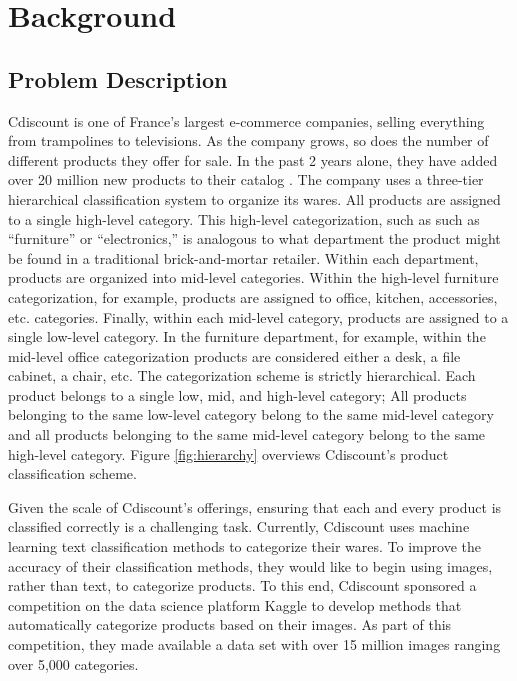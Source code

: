 \section{Background}

\subsection{Problem Description}


Cdiscount is one of France's largest e-commerce companies, selling everything from trampolines to televisions.
As the company grows, so does the number of different products they offer for sale.
In the past 2 years alone, they have added over 20 million new products to their catalog \cite{cDiscountKaggle}. 
The company uses a three-tier hierarchical classification system to organize its wares.
All products are assigned to a single high-level category.
This high-level categorization, such as such as ``furniture'' or ``electronics,'' is analogous to what department the product might be found in a traditional brick-and-mortar retailer. 
Within each department, products are organized into mid-level categories.
Within the high-level furniture categorization, for example, products are assigned to office, kitchen, accessories, etc. categories.
Finally, within each mid-level category, products are assigned to a single low-level category.
In the furniture department, for example, within the mid-level office categorization products are considered either a desk, a file cabinet, a chair, etc.
The categorization scheme is strictly hierarchical.
Each product belongs to a single low, mid, and high-level category; 
All products belonging to the same low-level category belong to the same mid-level category and all products belonging to the same mid-level category belong to the same high-level category.
Figure \ref{fig:hierarchy} overviews Cdiscount's product classification scheme.

Given the scale of Cdiscount's offerings, ensuring that each and every product is classified correctly is a challenging task.
Currently, Cdiscount uses machine learning text classification methods to categorize their wares.
To improve the accuracy of their classification methods, they would like to begin using images, rather than text, to categorize products.
To this end, Cdiscount sponsored a competition on the data science platform Kaggle to develop methods that automatically categorize products based on their images.
As part of this competition, they made available a data set with over 15 million images ranging over 5,000 categories.

